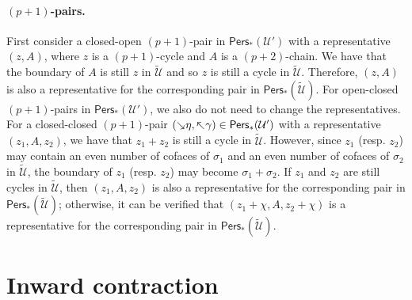 \documentclass[letterpaper,11pt]{article}
\theoremstyle{mythmstyle}
\theoremstyle{mydefstyle}
\theoremstyle{plain}
\theoremstyle{definition}
\newcommand{\Pers}{\mathsf{Pers}}
\newcommand{\<}[1]{\langle #1\rangle}
\newcommand{\add}[1]{\mskip-2.5mu\rotatebox[origin=c]{-45}{${\rightarrow}$}{#1}}
\newcommand{\del}[1]{\mskip-2.5mu\rotatebox[origin=c]{-45}{${\leftarrow}$}{#1}}
\newcommand{\Ucal}{\mathcal{U}}
\newcommand{\sG}{\sigma}
\newcommand{\Dim}{p}
\newcommand{\extsimp}{\chi}
\begin{document}
\paragraph{$(\Dim+1)$-pairs.}
First consider a closed-open $(\Dim+1)$-pair in $\Pers_*({\Ucal}')$
with a representative  $(z,A)$,
where $z$ is a $(\Dim+1)$-cycle and
$A$ is a $(\Dim+2)$-chain.
We have that the boundary of $A$ is still $z$ in $\tilde{\Ucal}$
and so $z$ is still a cycle in $\tilde{\Ucal}$.
Therefore, $(z,A)$ is also a representative for the
corresponding pair in $\Pers_*(\tilde{\Ucal})$.
For open-closed $(\Dim+1)$-pairs in $\Pers_*({\Ucal}')$,
we also do not need to change the representatives.
For a closed-closed $(\Dim+1)$-pair  $(\add{\eta},\del{\gamma})\in\Pers_*({\Ucal}')$
with a representative  $(z_1,A,z_2)$,
we have that $z_1+z_2$ is still a cycle in $\tilde{\Ucal}$.
However, since $z_1$ (resp. $z_2$) may contain an even number of cofaces of $\sG_1$
and an even number of cofaces of $\sG_2$ in $\tilde{\Ucal}$,
the boundary of $z_1$ (resp. $z_2$) may become $\sG_1+\sG_2$.
If $z_1$ and $z_2$ are still cycles in  $\tilde{\Ucal}$,
then $(z_1,A,z_2)$ is also a representative for the
corresponding pair in $\Pers_*(\tilde{\Ucal})$;
otherwise, it can be verified that $(z_1+\extsimp,A,z_2+\extsimp)$ is  a representative for the
corresponding pair in $\Pers_*(\tilde{\Ucal})$.

\section{Inward contraction}
\label{sec:fzz-in-contra}
\end{document}
